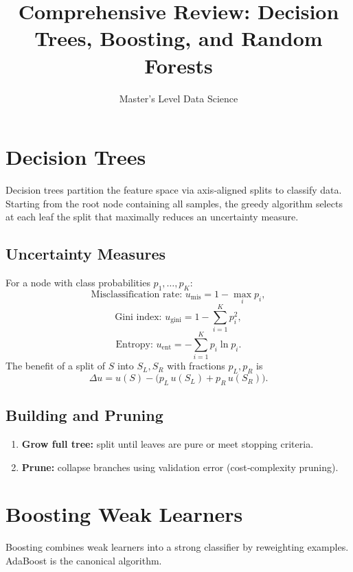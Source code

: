 \documentclass[11pt]{article}
\title{Comprehensive Review: Decision Trees, Boosting, and Random Forests}
\author{Master’s Level Data Science}
\date{}
\begin{document}
\maketitle
\tableofcontents
\bigskip

\section{Decision Trees}
Decision trees partition the feature space via axis‐aligned splits to classify data.  Starting from the root node containing all samples, the greedy algorithm selects at each leaf the split that maximally reduces an uncertainty measure.

\subsection{Uncertainty Measures}
For a node with class probabilities $p_1,\dots,p_K$:
\[
  \text{Misclassification rate: }
  u_{\mathrm{mis}} = 1 - \max_i p_i,
\]
\[
  \text{Gini index: }
  u_{\mathrm{gini}} = 1 - \sum_{i=1}^K p_i^2,
\]
\[
  \text{Entropy: }
  u_{\mathrm{ent}} = -\sum_{i=1}^K p_i\ln p_i.
\]
The benefit of a split of $S$ into $S_L,S_R$ with fractions $p_L,p_R$ is
\[
  \Delta u = u(S) - \bigl(p_L\,u(S_L) + p_R\,u(S_R)\bigr).
\]

\subsection{Building and Pruning}
\begin{enumerate}
  \item \textbf{Grow full tree:} split until leaves are pure or meet stopping criteria.
  \item \textbf{Prune:} collapse branches using validation error (cost‐complexity pruning).
\end{enumerate}

\section{Boosting Weak Learners}
Boosting combines weak learners into a strong classifier by reweighting examples.  AdaBoost is the canonical algorithm.
\end{document}
